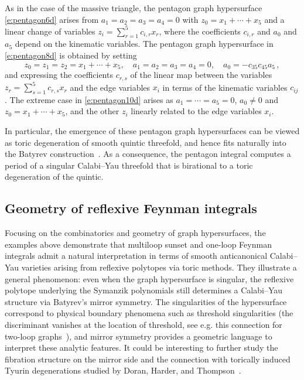 \documentclass[12pt,a4paper]{article}
\theoremstyle{plain}
\theoremstyle{remark}
\begin{document}
As in the case of the massive triangle, the pentagon graph hypersurface \eqref{e:pentagon6d} arises from $a_1=a_2=a_3=a_4=0$ with $z_0=x_1+\cdots +x_5$ and a linear change of variables $z_i=\sum_{r=1}^5c_{i,r}x_r$, where the coefficients $c_{i,r}$ and $a_0$ and $a_5$ depend on the kinematic variables. 
The pentagon graph hypersurface in \cref{e:pentagon8d} is obtained by setting 
%
\begin{equation}
z_0=z_1=z_2=x_1+\cdots+x_5, \quad
a_1=a_2=a_3=a_4=0,  \quad a_0=-c_{3 5} c_{45} a_{5}\, ,
\end{equation}
and expressing the coefficients $c_{r,s}$ of the linear map between the variables $z_r=\sum_{s=1}^5c_{r,s}x_r$ and the edge variables $x_i$ in terms of the kinematic variables $c_{ij}$.
The extreme case in \cref{e:pentagon10d} arises as $a_1=\cdots=a_5=0$, $a_0\neq0$ and $z_0=x_1+\cdots +x_5$, and the other $z_i$ linearly related to the edge variables $x_i$.

 
In particular, the emergence of these pentagon graph hypersurfaces can be viewed as toric
degeneration of  smooth quintic threefold, and hence fits naturally into the
Batyrev construction~\cite{Batyrev:1993oya}.  As a consequence, the pentagon integral computes
a period of a singular Calabi--Yau threefold that is birational to a
toric degeneration of the quintic.


\subsection{Geometry of reflexive Feynman integrals}

Focusing on the combinatorics and geometry of graph hypersurfaces, the examples above demonstrate that multiloop sunset and one-loop Feynman integrals admit a natural interpretation in terms of smooth anticanonical Calabi--Yau varieties arising from reflexive polytopes via toric methods.
They illustrate a general phenomenon: even when the graph
hypersurface is singular, the reflexive polytope underlying the Symanzik
polynomials still determines a Calabi--Yau structure via Batyrev's
mirror symmetry.  The singularities of the hypersurface correspond to
physical boundary phenomena such as threshold singularities (the
discriminant vanishes at the location of threshold, see e.g. this
connection for two-loop graphs~\cite{Doran:2023yzu}), and mirror
symmetry provides a geometric language to interpret these analytic
features.
%
It could be interesting to further study the fibration structure on the mirror side and the connection with  torically induced Tyurin degenerations studied by Doran, Harder, and Thompson~\cite{Doran:2016uea}.
\end{document}
